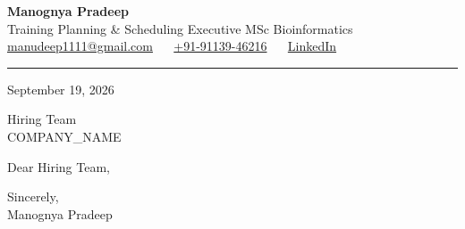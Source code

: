 \documentclass[11pt, letterpaper]{article}
\begin{document}
{\fontsize{18 pt}{20 pt}\selectfont\bfseries Manognya Pradeep}\\[4pt]
Training Planning \& Scheduling Executive \textbar{} MSc Bioinformatics\\[6pt]
\href{mailto:manudeep1111@gmail.com}{manudeep1111@gmail.com}
~\textbullet~
\href{tel:+91-91139-46216}{+91-91139-46216}
~\textbullet~
\href{https://www.linkedin.com/in/manognya-pradeep-960aa7210}{LinkedIn}

\vspace{12pt}
\hrule
\vspace{12pt}

September 19, 2026

\vspace{8pt}

Hiring Team\\
COMPANY\_NAME

\vspace{12pt}

Dear Hiring Team,




Sincerely,\\[12pt]
Manognya Pradeep
\end{document}
